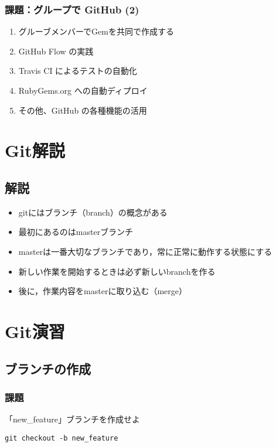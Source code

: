 \documentclass[a4paper,twoside,twocolumn]{bxjsarticle}
\begin{document}
\subsubsection{課題：グループで GitHub (2)}
\label{sec-4-2-2}
\begin{enumerate}
\item グルーブメンバーでGemを共同で作成する
\item GitHub Flow の実践
\item Travis CI によるテストの自動化
\item RubyGems.org への自動ディプロイ
\item その他、GitHub の各種機能の活用
\end{enumerate}

\section{Git解説}
\label{sec-5}
\subsection{解説}
\label{sec-5-1}
\begin{itemize}
\item gitにはブランチ（branch）の概念がある
\item 最初にあるのはmasterブランチ
\item masterは一番大切なブランチであり，常に正常に動作する状態にする
\item 新しい作業を開始するときは必ず新しいbranchを作る
\item 後に，作業内容をmasterに取り込む（merge）
\end{itemize}
\section{Git演習}
\label{sec-6}
\subsection{ブランチの作成}
\label{sec-6-1}
\subsubsection{課題}
\label{sec-6-1-1}

「new\_feature」ブランチを作成せよ

\begin{verbatim}
git checkout -b new_feature
\end{verbatim}
\end{document}
